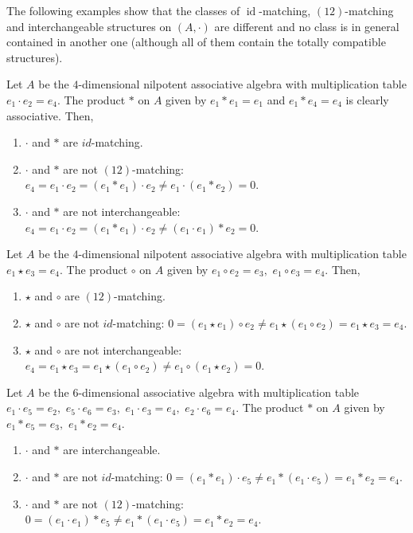 \documentclass{jonasart}
\DeclareMathOperator{\id}{id}
\begin{document}
	The following examples show that the classes of $\id$-matching, $(12)$-matching and interchangeable structures on $(A,\cdot)$ are different and no class is in general contained in another one (although all of them contain the totally compatible structures).

	\begin{example}
		Let $A$ be the $4$-dimensional nilpotent associative algebra with multiplication table $e_1\cdot e_2 =e_4$. The product $*$ on $A$ given by $e_1 *e_1 =e_1$ and $e_1 *e_4 =e_4$ is clearly associative. Then,
		\begin{enumerate}
			\item $\cdot$ and $*$ are $id$-matching.
			\item $\cdot$ and $*$ are not $(12)$-matching:
			$e_4 =e_1\cdot e_2 =(e_1 * e_1 ) \cdot e_2 \neq e_1\cdot (e_1 * e_2 )=0. $
			\item $\cdot$ and $*$ are not interchangeable:
			$e_4 =e_1\cdot e_2 =(e_1 * e_1 )\cdot e_2 \neq (e_1\cdot e_1 ) * e_2 =0.$
		\end{enumerate}
	\end{example}

	\begin{example}
		Let $A$ be the $4$-dimensional nilpotent associative algebra with multiplication table $e_1\star e_3 =e_4$. The product $\circ$ on $A$ given by $e_1 \circ e_2 =e_3,$ $e_1\circ e_3 =e_4$. Then,
		\begin{enumerate}
			\item $\star$ and $\circ$ are $(12)$-matching.
			\item $\star$ and $\circ$ are not $id$-matching:
			$0=(e_1 \star e_1 ) \circ e_2 \neq e_1 \star (e_1 \circ e_2 )=e_1 \star e_3 = e_4. $
			\item $\star$ and $\circ$ are not interchangeable:
			$e_4 = e_1 \star e_3 = e_1 \star (e_1 \circ e_2 ) \neq e_1 \circ (e_1 \star e_2 )=0.$
		\end{enumerate}
	\end{example}

	\begin{example}
		Let $A$ be the 6-dimensional associative algebra with multiplication table $e_1\cdot e_5 =e_2,$ $e_5\cdot e_6 =e_3,$ $e_1\cdot e_3 =e_4,$ $e_2\cdot e_6 =e_4.$ The product $\ast$ on $A$ given by $e_1 \ast e_5 = e_3,$ $e_1 \ast e_2 = e_4.$
		\begin{enumerate}
			\item $\cdot$ and $\ast$ are interchangeable.
			\item $\cdot$ and $\ast$ are not $id$-matching:
			$0= (e_1\ast e_1 )\cdot e_5 \neq e_1\ast (e_1\cdot e_5 )=e_1\ast e_2 =e_4.$
			\item $\cdot$ and $\ast$ are not $(12)$-matching:
			$0=(e_1\cdot e_1 )\ast e_5 \neq e_1\ast (e_1\cdot e_5 )=e_1\ast e_2 =e_4.$
		\end{enumerate}
	\end{example}
\end{document}
